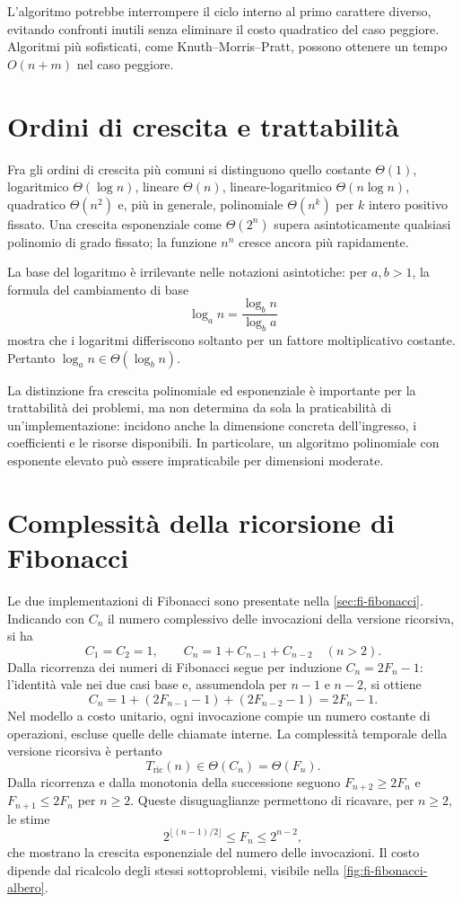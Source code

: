 L'algoritmo potrebbe interrompere il ciclo interno al primo
carattere diverso, evitando confronti inutili senza eliminare
il costo quadratico del caso peggiore. Algoritmi più sofisticati,
come Knuth--Morris--Pratt, possono ottenere un tempo
\(O(n+m)\) nel caso peggiore.

\clearpage

\section{Ordini di crescita e trattabilità}
\label{sec:fi-complessita-ordini}

Fra gli ordini di crescita più comuni si distinguono quello costante
\(\Theta(1)\), logaritmico \(\Theta(\log n)\), lineare \(\Theta(n)\),
lineare-logaritmico \(\Theta(n\log n)\), quadratico \(\Theta(n^2)\)
e, più in generale, polinomiale \(\Theta(n^k)\) per \(k\) intero
positivo fissato. Una crescita esponenziale come \(\Theta(2^n)\)
supera asintoticamente qualsiasi polinomio di grado fissato;
la funzione \(n^n\) cresce ancora più rapidamente.

La base del logaritmo è irrilevante nelle notazioni asintotiche:
per \(a,b>1\), la formula del cambiamento di base
\[
  \log_a n=\frac{\log_b n}{\log_b a}
\]
mostra che i logaritmi differiscono soltanto per un fattore
moltiplicativo costante. Pertanto
\(\log_a n\in\Theta(\log_b n)\).

La distinzione fra crescita polinomiale ed esponenziale è importante
per la trattabilità dei problemi, ma non determina da sola la
praticabilità di un'implementazione: incidono anche la dimensione
concreta dell'ingresso, i coefficienti e le risorse disponibili.
In particolare, un algoritmo polinomiale con esponente elevato può
essere impraticabile per dimensioni moderate.

\section{Complessità della ricorsione di Fibonacci}
\label{sec:fi-complessita-fibonacci}

Le due implementazioni di Fibonacci sono presentate nella
\cref{sec:fi-fibonacci}. Indicando con \(C_n\) il numero complessivo
delle invocazioni della versione ricorsiva, si ha
\[
  C_1=C_2=1,\qquad C_n=1+C_{n-1}+C_{n-2}\quad(n>2).
\]
Dalla ricorrenza dei numeri di Fibonacci segue per induzione
\(C_n=2F_n-1\): l'identità vale nei due casi base e, assumendola
per \(n-1\) e \(n-2\), si ottiene
\[
  C_n=1+(2F_{n-1}-1)+(2F_{n-2}-1)=2F_n-1.
\]
Nel modello a costo unitario, ogni invocazione compie un numero
costante di operazioni, escluse quelle delle chiamate interne.
La complessità temporale della versione ricorsiva è pertanto
\[
  T_{\mathrm{ric}}(n)\in\Theta(C_n)=\Theta(F_n).
\]
Dalla ricorrenza e dalla monotonia della successione seguono
\(F_{n+2}\ge2F_n\) e \(F_{n+1}\le2F_n\) per \(n\ge2\).
Queste disuguaglianze permettono di ricavare, per \(n\ge2\),
le stime
\[
  2^{\lfloor(n-1)/2\rfloor}\le F_n\le2^{n-2},
\]
che mostrano la crescita esponenziale del numero delle invocazioni.
Il costo dipende dal ricalcolo degli stessi sottoproblemi, visibile
nella \cref{fig:fi-fibonacci-albero}.

